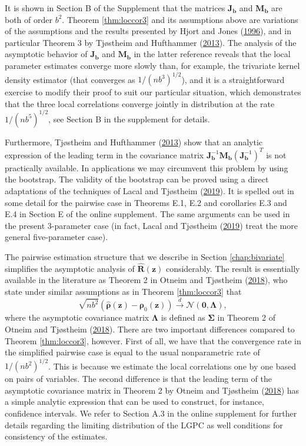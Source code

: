 \documentclass[
  12pt,
  letterpaper]{article}
\newcommand{\z}{\bm{z}}
\newcommand{\hR}{\widehat{\bm{R}}}
\newcommand{\frho}{\bm{\rho}}
\newcommand{\hfrho}{\widehat{\bm{\rho}}}
\newcommand{\hh}{\bm{b}}
\newcommand{\fSigma}{\bm{\Sigma}}
\newcommand{\fLambda}{\bm{\Lambda}}
\newcommand{\Jb}{\bm{J}_{\hh}}
\newcommand{\Mb}{\bm{M}_{\hh}}
\theoremstyle{definition}
\theoremstyle{definition}
\theoremstyle{definition}
\theoremstyle{remark}
\begin{document}
It is shown in Section B of the Supplement that the matrices \(\Jb\) and \(\Mb\) are both of order \(b^2\). Theorem \ref{thm:loccor3} and its assumptions above are variations of the assumptions and the results presented by Hjort and Jones (\protect\hyperlink{ref-hjort1996locally}{1996}), and in particular Theorem 3 by Tjøstheim and Hufthammer (\protect\hyperlink{ref-tjostheim2013local}{2013}). The analysis of the asymptotic behavior of \(\Jb\) and \(\Mb\) in the latter reference reveals that the local parameter estimates converge more slowly than, for example, the trivariate kernel density estimator (that converges as \(1/(nb^3)^{1/2}\)), and it is a straightforward exercise to modify their proof to suit our particular situation, which demonstrates that the three local correlations converge jointly in distribution at the rate \(1/(nb^5)^{1/2}\), see Section B in the supplement for details.

Furthermore, Tjøstheim and Hufthammer (\protect\hyperlink{ref-tjostheim2013local}{2013}) show that an analytic expression of the leading term in the covariance matrix \(\Jb^{-1}\Mb(\Jb^{-1})^T\) is not practically available. In applications we may circumvent this problem by using the bootstrap. The validity of the bootstrap can be proved using a direct adaptations of the techniques of Lacal and Tjøstheim (\protect\hyperlink{ref-lacal2018estimating}{2019}). It is spelled out in some detail for the pairwise case in Theorems E.1, E.2 and corollaries E.3 and E.4 in Section E of the online supplement. The same arguments can be used in the present 3-parameter case (in fact, Lacal and Tjøstheim (\protect\hyperlink{ref-lacal2018estimating}{2019}) treat the more general five-parameter case).

The pairwise estimation structure that we describe in Section \ref{chap:bivariate} simplifies the asymptotic analysis of \(\hR(\z)\) considerably. The result is essentially available in the literature as Theorem 2 in Otneim and Tjøstheim (\protect\hyperlink{ref-otneim2017conditional}{2018}), who state under similar assumptions as in Theorem \ref{thm:loccor3} that
\begin{equation}
\sqrt{nb^2}\left(\hfrho(\z) - \frho_0(\z)\right) \stackrel{d}{\rightarrow} \mathcal{N}(\bm{0}, \fLambda),
\label{eq:ot2018}
\end{equation}
where the asymptotic covariance matrix \(\fLambda\) is defined as \(\fSigma\) in Theorem 2 of Otneim and Tjøstheim (\protect\hyperlink{ref-otneim2017conditional}{2018}). There are two important differences compared to Theorem \ref{thm:loccor3}, however. First of all, we have that the convergence rate in the simplified pairwise case is equal to the usual nonparametric rate of \(1/(nb^2)^{1/2}\). This is because we estimate the local correlations one by one based on pairs of variables. The second difference is that the leading term of the asymptotic covariance matrix in Theorem 2 by Otneim and Tjøstheim (\protect\hyperlink{ref-otneim2017conditional}{2018}) has a simple analytic expression that can be used to construct, for instance, confidence intervals. We refer to Section A.3 in the online supplement for further details regarding the limiting distribution of the LGPC as well conditions for consistency of the estimates.
\end{document}
